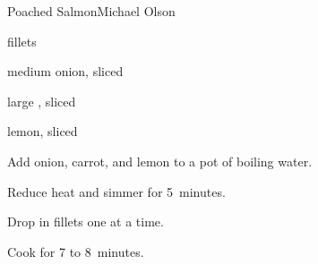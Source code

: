 \begin{recipe}{Poached Salmon}{Michael Olson}{}

\begin{ingredients}
\item {}  fillets
\item medium onion, sliced
\item large , sliced
\item lemon, sliced
\end{ingredients}

\begin{directions}
\item Add onion, carrot, and lemon to a pot of boiling water.
\item Reduce heat and simmer for 5~minutes.
\item Drop in fillets one at a time.
\item Cook for 7 to 8~minutes.
\end{directions}

\end{recipe}
